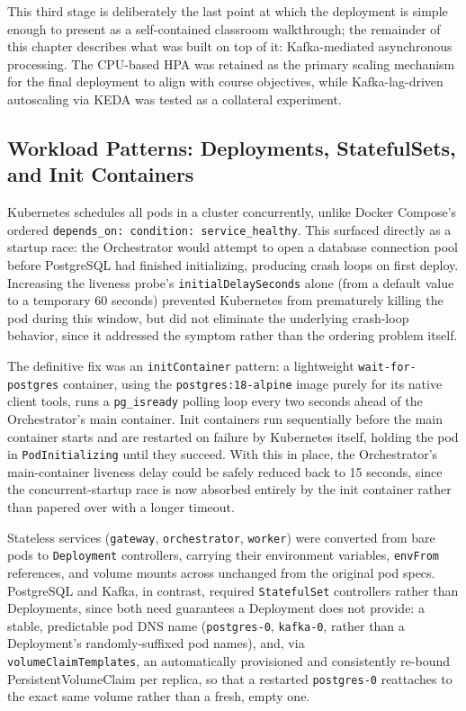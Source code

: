 \documentclass[twoside]{supsistudent}
\begin{document}
This third stage is deliberately the last point at which the deployment is simple enough to present as a self-contained classroom walkthrough; the remainder of this chapter describes what was built on top of it: Kafka-mediated asynchronous processing. The CPU-based HPA was retained as the primary scaling mechanism for the final deployment to align with course objectives, while Kafka-lag-driven autoscaling via KEDA was tested as a collateral experiment.

\subsection{Workload Patterns: Deployments, StatefulSets, and Init Containers}
Kubernetes schedules all pods in a cluster concurrently, unlike Docker Compose's ordered \texttt{depends\_on: condition: service\_healthy}. This surfaced directly as a startup race: the Orchestrator would attempt to open a database connection pool before PostgreSQL had finished initializing, producing crash loops on first deploy. Increasing the liveness probe's \texttt{initialDelaySeconds} alone (from a default value to a temporary 60 seconds) prevented Kubernetes from prematurely killing the pod during this window, but did not eliminate the underlying crash-loop behavior, since it addressed the symptom rather than the ordering problem itself.

The definitive fix was an \texttt{initContainer} pattern: a lightweight \texttt{wait-for-postgres} container, using the \texttt{postgres:18-alpine} image purely for its native client tools, runs a \texttt{pg\_isready} polling loop every two seconds ahead of the Orchestrator's main container. Init containers run sequentially before the main container starts and are restarted on failure by Kubernetes itself, holding the pod in \texttt{PodInitializing} until they succeed. With this in place, the Orchestrator's main-container liveness delay could be safely reduced back to 15 seconds, since the concurrent-startup race is now absorbed entirely by the init container rather than papered over with a longer timeout.

Stateless services (\texttt{gateway}, \texttt{orchestrator}, \texttt{worker}) were converted from bare pods to \texttt{Deployment} controllers, carrying their environment variables, \texttt{envFrom} references, and volume mounts across unchanged from the original pod specs. PostgreSQL and Kafka, in contrast, required \texttt{StatefulSet} controllers rather than Deployments, since both need guarantees a Deployment does not provide: a stable, predictable pod DNS name (\texttt{postgres-0}, \texttt{kafka-0}, rather than a Deployment's randomly-suffixed pod names), and, via \\ \texttt{volumeClaimTemplates}, an automatically provisioned and consistently re-bound PersistentVolumeClaim per replica, so that a restarted \texttt{postgres-0} reattaches to the exact same volume rather than a fresh, empty one.
\end{document}
